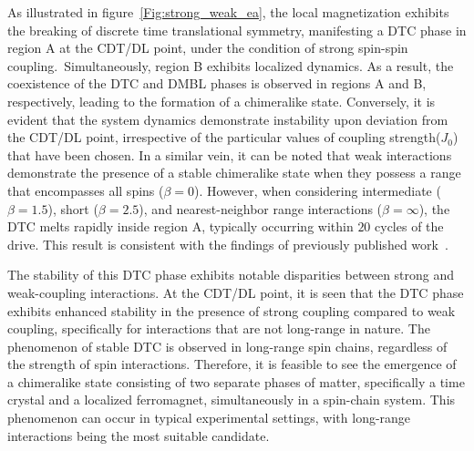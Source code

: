 \documentclass[12pt]{iopart}
\begin{document}
As illustrated in figure~\ref{Fig:strong_weak_ea}, the local magnetization exhibits the breaking of discrete time translational symmetry, manifesting a DTC phase in region A at the CDT/DL point, under the condition of strong spin-spin coupling. Simultaneously, region B exhibits localized dynamics. As a result, the coexistence of the DTC and DMBL phases is observed in regions A and B, respectively, leading to the formation of a chimeralike state. Conversely, it is evident that the system dynamics demonstrate instability upon deviation from the CDT/DL point, irrespective of the particular values of coupling strength($J_0$) that have been chosen. In a similar vein, it can be noted that weak interactions demonstrate the presence of a stable chimeralike state when they possess a range that encompasses all spins ($\beta=0$). However, when considering intermediate ($\beta = 1.5$), short ($\beta = 2.5$), and nearest-neighbor range interactions ($\beta = \infty$), the DTC melts rapidly inside region A, typically occurring within $20$ cycles of the drive. This result is consistent with the findings of previously published work~\cite{sakurai_phys_nodate}.
	
The stability of this DTC phase exhibits notable disparities between strong and weak-coupling interactions. At the CDT/DL point, it is seen that the DTC phase exhibits enhanced stability in the presence of strong coupling compared to weak coupling, specifically for interactions that are not long-range in nature. The phenomenon of stable DTC is observed in long-range spin chains, regardless of the strength of spin interactions. Therefore, it is feasible to see the emergence of a chimeralike state consisting of two separate phases of matter, specifically a time crystal and a localized ferromagnet, simultaneously in a spin-chain system. This phenomenon can occur in typical experimental settings, with long-range interactions being the most suitable candidate.
\end{document}
